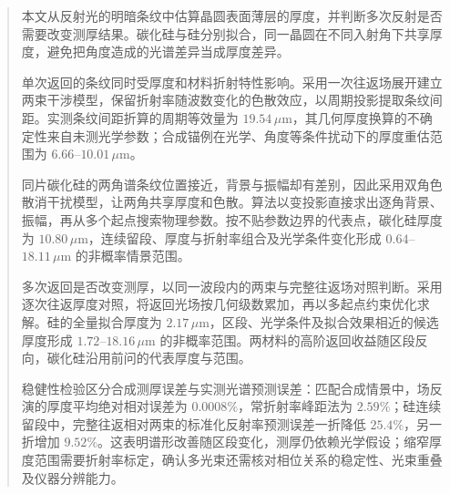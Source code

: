 \begin{abstract}

本文从反射光的明暗条纹中估算晶圆表面薄层的厚度，并判断多次反射是否需要改变测厚结果。碳化硅与硅分别拟合，同一晶圆在不同入射角下共享厚度，避免把角度造成的光谱差异当成厚度差异。

单次返回的条纹同时受厚度和材料折射特性影响。采用一次往返场展开建立两束干涉模型，保留折射率随波数变化的色散效应，以周期投影提取条纹间距。实测条纹间距折算的周期等效量为 $19.54\,\mu\mathrm{m}$，其几何厚度换算的不确定性来自未测光学参数；合成锚例在光学、角度等条件扰动下的厚度重估范围为 $6.66$--$10.01\,\mu\mathrm{m}$。

同片碳化硅的两角谱条纹位置接近，背景与振幅却有差别，因此采用双角色散消干扰模型，让两角共享厚度和色散。算法以变投影直接求出逐角背景、振幅，再从多个起点搜索物理参数。按不贴参数边界的代表点，碳化硅厚度为 $10.80\,\mu\mathrm{m}$，连续留段、厚度与折射率组合及光学条件变化形成 $0.64$--$18.11\,\mu\mathrm{m}$ 的非概率情景范围。

多次返回是否改变测厚，以同一波段内的两束与完整往返场对照判断。采用逐次往返厚度对照，将返回光场按几何级数累加，再以多起点约束优化求解。硅的全量拟合厚度为 $2.17\,\mu\mathrm{m}$，区段、光学条件及拟合效果相近的候选厚度形成 $1.72$--$18.16\,\mu\mathrm{m}$ 的非概率范围。两材料的高阶返回收益随区段反向，碳化硅沿用前问的代表厚度与范围。

稳健性检验区分合成测厚误差与实测光谱预测误差：匹配合成情景中，场反演的厚度平均绝对相对误差为 $0.0008\%$，常折射率峰距法为 $2.59\%$；硅连续留段中，完整往返相对两束的标准化反射率预测误差一折降低 $25.4\%$，另一折增加 $9.52\%$。这表明谱形改善随区段变化，测厚仍依赖光学假设；缩窄厚度范围需要折射率标定，确认多光束还需核对相位关系的稳定性、光束重叠及仪器分辨能力。

\label{abstract:end}
\end{abstract}
